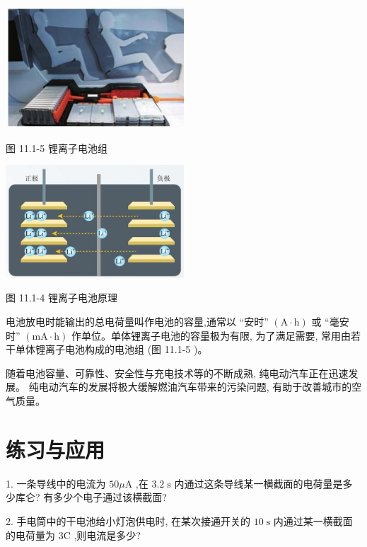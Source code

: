 \documentclass[10pt]{article}
\begin{document}
\begin{center}
\includegraphics[max width=0.5\textwidth]{images/01911d5f-8e38-70c0-b5b8-2b399bd115b6_61_852776.jpg}
\end{center}

图 11.1-5 锂离子电池组

\begin{center}
\includegraphics[max width=0.5\textwidth]{images/01911d5f-8e38-70c0-b5b8-2b399bd115b6_61_187558.jpg}
\end{center}

图 11.1-4 锂离子电池原理

电池放电时能输出的总电荷量叫作电池的容量,通常以 “安时” \(\left( {\mathrm{A} \cdot \mathrm{h}}\right)\) 或 “毫安时” \(\left( {\mathrm{{mA}} \cdot \mathrm{h}}\right)\) 作单位。单体锂离子电池的容量极为有限, 为了满足需要, 常用由若干单体锂离子电池构成的电池组 (图 11.1-5 )。

随着电池容量、可靠性、安全性与充电技术等的不断成熟, 纯电动汽车正在迅速发展。 纯电动汽车的发展将极大缓解燃油汽车带来的污染问题, 有助于改善城市的空气质量。

\section*{练习与应用}

1. 一条导线中的电流为 \({50\mu }\mathrm{A}\) ,在 \({3.2}\mathrm{\;s}\) 内通过这条导线某一横截面的电荷量是多少库仑? 有多少个电子通过该横截面?

2. 手电筒中的干电池给小灯泡供电时, 在某次接通开关的 \({10}\mathrm{\;s}\) 内通过某一横截面的电荷量为 \(3\mathrm{C}\) ,则电流是多少?
\end{document}
